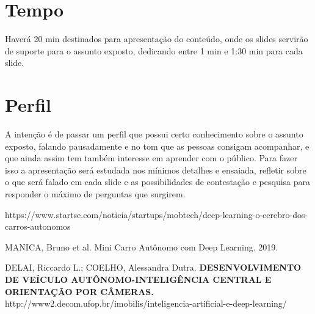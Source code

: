 \documentclass[12pt,a4paper]{article}
\begin{document}
    

    \section{Tempo}
    \par Haverá 20 min destinados para apresentação do conteúdo, onde os slides servirão de suporte para o assunto exposto, dedicando entre 1 min e 1:30 min para cada slide.  
    
    \section{Perfil}
    \par A intenção é de passar um perfil que possui certo conhecimento sobre o assunto exposto, falando pausadamente e no tom que as pessoas consigam acompanhar, e que ainda assim tem também interesse em aprender com o público. Para fazer isso a apresentação será estudada nos mínimos detalhes e ensaiada, refletir sobre o que será falado em cada slide e as possibilidades de contestação e pesquisa para responder o máximo de perguntas que surgirem.


     
    \begin{thebibliography}{BIBLIOGRAFIA}

         https://www.startse.com/noticia/startups/mobtech/deep-learning-o-cerebro-dos-carros-autonomos
        
         MANICA, Bruno et al. Mini Carro Autônomo com Deep Learning. 2019.

         DELAI, Riccardo L.; COELHO, Alessandra Dutra. \textbf{DESENVOLVIMENTO DE VEÍCULO AUTÔNOMO-INTELIGÊNCIA CENTRAL E ORIENTAÇÃO POR CÂMERAS.}
         http://www2.decom.ufop.br/imobilis/inteligencia-artificial-e-deep-learning/

        
    
    \end{thebibliography}




\end{document}
